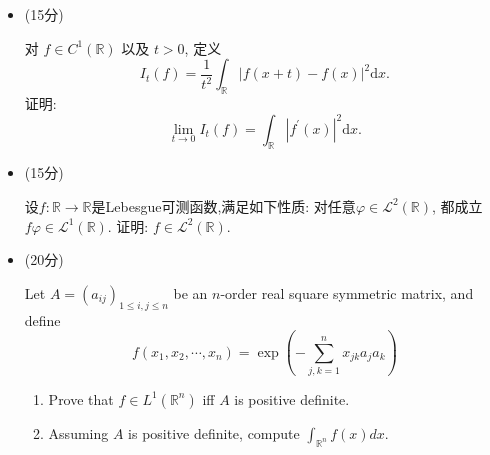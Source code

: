 \begin{itemize}
2.求极限
$$
\lim_{n\rightarrow \infty}\int_0^{n^2}{\frac{x^{1/n}\cos x}{1+x^n}\text{d}x}.
$$

\item[四、](15分)

对 $f \in C^1(\mathbb{R})$ 以及 $t>0$, 定义
$$I_t(f)=\frac{1}{t^2} \int_{\mathbb{R}}|f(x+t)-f(x)|^2 \text{d} x.$$
证明:
$$\lim_{t \rightarrow 0} I_t(f)=\int_{\mathbb{R}}|f^{\prime}(x)|^2 \text{d} x.$$


\item[五、](15分)

设$ f\colon \mathbb{R} \to \mathbb{R}  $是Lebesgue可测函数,满足如下性质:
对任意$\varphi\in \mathcal{L}^{2}(\mathbb{R})$,
都成立$f\varphi\in \mathcal{L}^{1}(\mathbb{R})$.
证明: $f\in \mathcal{L}^{2}(\mathbb{R})$.

\item[六、](20分)

Let $ A=(a_{ij})_{1\le i,j\le n} $ be an $ n$-order real square symmetric matrix, and define
$$ f( x_1,x_2,\cdots ,x_n ) =\exp \left( -\sum_{j,k=1}^n{x_{jk}a_ja_k} \right)  $$
\begin{enumerate}
\item Prove that $ f\in L^{1}(\mathbb{R} ^{n}) $ iff $ A $ is positive definite.
\item Assuming $ A $ is positive definite, compute $ \int_{\mathbb{R} ^{n}}f(x)dx $.
\end{enumerate}

\end{itemize}

